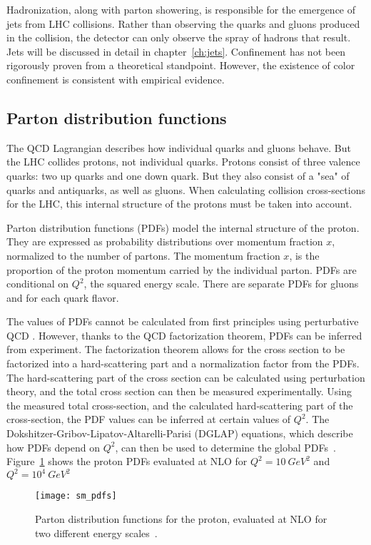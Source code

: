 Hadronization, along with parton showering, is responsible for the emergence of jets from LHC collisions.
Rather than observing the quarks and gluons produced in the collision,
the detector can only observe the spray of hadrons that result.
Jets will be discussed in detail in chapter~\ref{ch:jets}.
Confinement has not been rigorously proven from a theoretical standpoint.
However, the existence of color confinement is consistent with empirical evidence.

\subsection{Parton distribution functions}\label{subsec:qcd_pdfs}

The QCD Lagrangian describes how individual quarks and gluons behave.
But the LHC collides protons, not individual quarks.
Protons consist of three valence quarks: two up quarks and one down quark.
But they also consist of a "sea" of quarks and antiquarks, as well as gluons.
When calculating collision cross-sections for the LHC, this internal structure of the protons must be taken into account.

Parton distribution functions (PDFs) model the internal structure of the proton.
They are expressed as probability distributions over momentum fraction $x$, normalized to the number of partons.
The momentum fraction $x$, is the proportion of the proton momentum carried by the individual parton.
PDFs are conditional on $Q^2$, the squared energy scale.
There are separate PDFs for gluons and for each quark flavor.

The values of PDFs cannot be calculated from first principles using perturbative QCD .
However, thanks to the QCD factorization theorem, PDFs can be inferred from experiment.
The factorization theorem allows for the cross section to be factorized into a hard-scattering part and a normalization factor from the PDFs.
The hard-scattering part of the cross section can be calculated using perturbation theory, and the total cross section can then be measured experimentally.
Using the measured total cross-section, and the calculated hard-scattering part of the cross-section, the PDF values can be inferred at certain values of $Q^2$.
The Dokshitzer-Gribov-Lipatov-Altarelli-Parisi (DGLAP) equations, which describe how PDFs depend on $Q^2$, can then be used to determine the global PDFs~\cite{sm-dglap}.
Figure~\ref{fig:sm_pdfs} shows the proton PDFs evaluated at NLO for $Q^2 = 10~GeV^2$ and $Q^2 = 10^{4}~GeV^2$
\begin{figure}[!ht]
    \centering
\texttt{[image: sm\_pdfs]}
\caption{Parton distribution functions for the proton, evaluated at NLO for two different energy scales~\cite{sm-pdf-2009}.}
\label{fig:sm_pdfs}
\end{figure}

